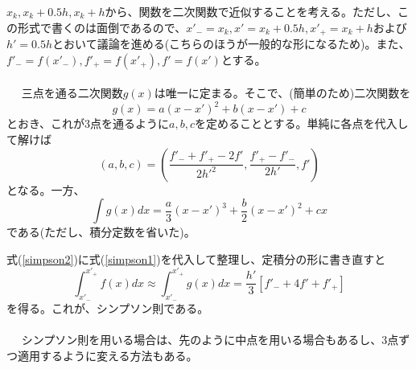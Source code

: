 $x_k,x_k+0.5h,x_k+h$から、関数を二次関数で近似することを考える。ただし、この形式で書くのは面倒であるので、$x'_-=x_k,x'=x_k+0.5h,x'_+=x_k+h$および$h'=0.5h$とおいて議論を進める(こちらのほうが一般的な形になるため)。また、$f'_-=f(x'_-),f'_+=f(x'_+),f'=f(x')$とする。
\\ \\　
三点を通る二次関数$g(x)$は唯一に定まる。そこで、(簡単のため)二次関数を
\begin{equation}
g(x)=a(x-x')^2+b(x-x')+c
\end{equation}
とおき、これが3点を通るように$a,b,c$を定めることとする。単純に各点を代入して解けば
\begin{equation}
\left(a,b,c\right)=\left(\frac{f'_-+f'_+-2f'}{2h'^2},\frac{f'_+-f'_-}{2h'},f'\right) \label{simpson1}
\end{equation}
となる。一方、
\begin{equation}
\int g(x)dx=\frac{a}{3}(x-x')^3+\frac{b}{2}(x-x')^2+cx \label{simpson2}
\end{equation}
である(ただし、積分定数を省いた)。

式(\ref{simpson2})に式(\ref{simpson1})を代入して整理し、定積分の形に書き直すと
\begin{equation}
\int^{x'_+}_{x'_-}f(x)dx\approx \int^{x'_+}_{x'_-}g(x)dx=\frac{h'}{3}[f'_-+4f'+f'_+]
\end{equation}
を得る。これが、シンプソン則である。
\\ \\　
シンプソン則を用いる場合は、先のように中点を用いる場合もあるし、3点ずつ適用するように変える方法もある。

